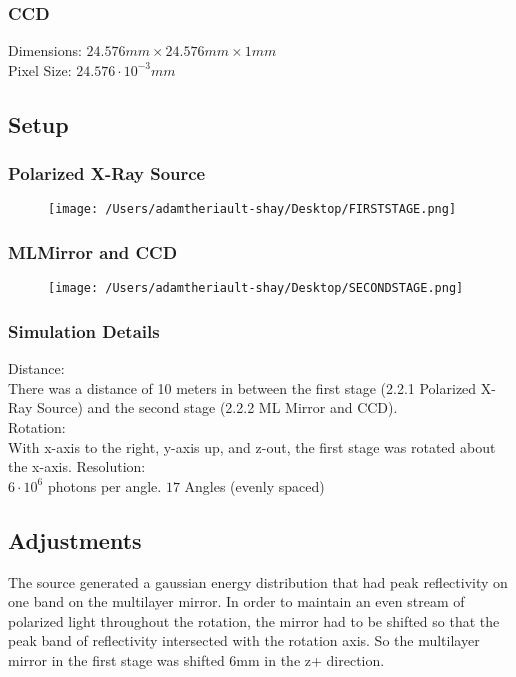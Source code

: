 \documentclass[11pt, oneside]{article}   	%
\begin{document}
\subsubsection{CCD}
Dimensions: $24.576mm \times 24.576mm \times 1mm$\\
Pixel Size: $24.576\cdot 10^{-3} mm$

\subsection{Setup}


\subsubsection{Polarized X-Ray Source}
\begin{figure}[h!]
\texttt{[image: /Users/adamtheriault-shay/Desktop/FIRSTSTAGE.png]}
\end{figure}

\newpage
\subsubsection{MLMirror and CCD}
\begin{figure}[h!]
\texttt{[image: /Users/adamtheriault-shay/Desktop/SECONDSTAGE.png]}
\end{figure}

\subsubsection{Simulation Details}
Distance:\\
There was a distance of 10 meters in between the first stage (2.2.1 Polarized X-Ray Source) and the second stage (2.2.2 ML Mirror and CCD).\\
Rotation:\\
With x-axis to the right, y-axis up, and z-out, the first stage was rotated about the x-axis.
Resolution:\\
$6\cdot 10^{6}$ photons per angle. $17 $ Angles (evenly spaced)

\subsection{Adjustments}
The source generated a gaussian energy distribution that had peak reflectivity on one band on the multilayer mirror. In order to maintain an even stream of polarized light throughout the rotation, the mirror had to be shifted so that the peak band of reflectivity intersected with the rotation axis. So the multilayer mirror in the first stage was shifted 6mm in the z+ direction.
\end{document}
